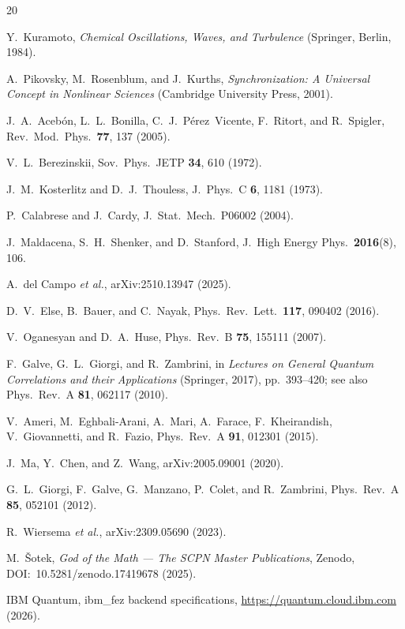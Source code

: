 \documentclass[twocolumn,prl,superscriptaddress,showpacs,floatfix]{revtex4-2}
\begin{document}
\begin{thebibliography}{20}

Y.~Kuramoto,
\emph{Chemical Oscillations, Waves, and Turbulence}
(Springer, Berlin, 1984).

A.~Pikovsky, M.~Rosenblum, and J.~Kurths,
\emph{Synchronization: A Universal Concept in Nonlinear Sciences}
(Cambridge University Press, 2001).

J.~A.~Aceb\'on, L.~L.~Bonilla, C.~J.~P\'erez~Vicente, F.~Ritort, and R.~Spigler,
Rev.\ Mod.\ Phys.\ \textbf{77}, 137 (2005).

V.~L.~Berezinskii,
Sov.\ Phys.\ JETP \textbf{34}, 610 (1972).

J.~M.~Kosterlitz and D.~J.~Thouless,
J.\ Phys.\ C \textbf{6}, 1181 (1973).

P.~Calabrese and J.~Cardy,
J.\ Stat.\ Mech.\ P06002 (2004).

J.~Maldacena, S.~H.~Shenker, and D.~Stanford,
J.\ High Energy Phys.\ \textbf{2016}(8), 106.

A.~del Campo \emph{et al.},
arXiv:2510.13947 (2025).

D.~V.~Else, B.~Bauer, and C.~Nayak,
Phys.\ Rev.\ Lett.\ \textbf{117}, 090402 (2016).

V.~Oganesyan and D.~A.~Huse,
Phys.\ Rev.\ B \textbf{75}, 155111 (2007).

F.~Galve, G.~L.~Giorgi, and R.~Zambrini,
in \emph{Lectures on General Quantum Correlations and their Applications}
(Springer, 2017), pp.~393--420;
see also Phys.\ Rev.\ A \textbf{81}, 062117 (2010).

V.~Ameri, M.~Eghbali-Arani, A.~Mari, A.~Farace, F.~Kheirandish,
V.~Giovannetti, and R.~Fazio,
Phys.\ Rev.\ A \textbf{91}, 012301 (2015).

J.~Ma, Y.~Chen, and Z.~Wang,
arXiv:2005.09001 (2020).

G.~L.~Giorgi, F.~Galve, G.~Manzano, P.~Colet, and R.~Zambrini,
Phys.\ Rev.\ A \textbf{85}, 052101 (2012).

R.~Wiersema \emph{et al.},
arXiv:2309.05690 (2023).

M.~\v{S}otek,
\emph{God of the Math --- The SCPN Master Publications},
Zenodo, DOI:~10.5281/zenodo.17419678 (2025).

IBM Quantum,
ibm\_fez backend specifications,
\url{https://quantum.cloud.ibm.com} (2026).

\end{thebibliography}
\end{document}
